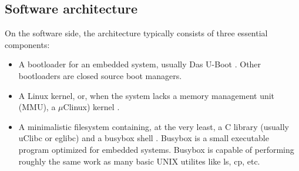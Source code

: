 \documentclass[conference]{IEEEtran}
\newcommand{\nota}[1]{}
\begin{document}
\subsection{Software architecture}

\nota {
En el lado software, la arquitectura consiste típicamente de tres componentes esenciales :
}

On the software side, the architecture typically consists of three essential components:

\nota {
\begin{itemize}
\item Un gestor de arranque (del inglés ``bootloader'') para un sistema embebido,
que generalmente es Das U-Boot \cite{uboot}. Si no se utiliza U-Boot entonces
es posible encontrar un gestor de arranque de código cerrado.
\item Un kernel Linux o uClinux en caso de ser un sistema sin una
unidad de manejo de memoria, MMU (del inglés ``Memory Management Unit''). 
\item Un sistema de archivos mínimo que contiene, al menos, una biblioteca de C
(generalmente uClibc o eglibc), y busybox, el cual es un pequeño programa ejecutable,
optimizado para sistemas embebidos, que puede realizar las operaciones
de muchas de las utilidades  básicas de UNIX (ls, cp, etc.).
\end{itemize}
}

\begin{itemize}
\item A bootloader for an embedded system, usually Das U-Boot \cite{uboot}. Other bootloaders are closed source boot managers.
\item A Linux kernel, or, when the system lacks a memory management unit (MMU), a
$\mu$Clinux) kernel \cite{linux, uclinux}.
\item A minimalistic filesystem containing, at the very least, a C library (usually uClibc or eglibc) and a busybox shell \cite{busybox}. Busybox is a small executable program optimized for embedded systems. Busybox is capable of performing roughly the same work as many basic UNIX utilites like ls, cp, etc.
\end{itemize}
\nota {
Algunas veces existe un cuarto componente de software, que son las aplicaciones
y controladores de hardware (del inglés ``drivers'') del fabricante.
Las aplicaciones muchas veces no son de interés, pero si los controladores.
Si existiesen controladores de código cerrado
entonces el trabajo de preparar un Linux embebido con soporte
para todo el hardware será difícil (debido a que no se tiene acceso
al código fuente). En nuestra experiencia con el ENTC-1000 no encontramos drivers
de código cerrado, por lo que este punto está fuera del alcance de este artículo. 
}
\end{document}

